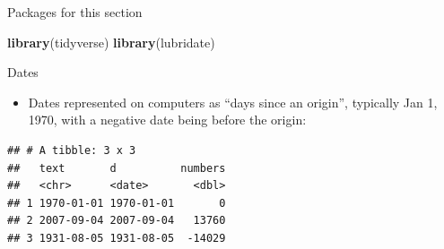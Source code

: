 \documentclass[ignorenonframetext,]{beamer}
\newenvironment{Shaded}{\begin{snugshade}}{\end{snugshade}}
\newcommand{\DataTypeTok}[1]{\textcolor[rgb]{0.13,0.29,0.53}{#1}}
\newcommand{\KeywordTok}[1]{\textcolor[rgb]{0.13,0.29,0.53}{\textbf{#1}}}
\newcommand{\NormalTok}[1]{#1}
\newcommand{\OperatorTok}[1]{\textcolor[rgb]{0.81,0.36,0.00}{\textbf{#1}}}
\newcommand{\StringTok}[1]{\textcolor[rgb]{0.31,0.60,0.02}{#1}}
\providecommand{\tightlist}{%
  \setlength{\itemsep}{0pt}\setlength{\parskip}{0pt}}
\begin{document}
\begin{frame}[fragile]{Packages for this section}
\protect\hypertarget{packages-for-this-section}{}

\begin{Shaded}
\begin{Highlighting}[]
\KeywordTok{library}\NormalTok{(tidyverse)}
\KeywordTok{library}\NormalTok{(lubridate)}
\end{Highlighting}
\end{Shaded}

\end{frame}

\begin{frame}[fragile]{Dates}
\protect\hypertarget{dates}{}

\begin{itemize}
\tightlist
\item
  Dates represented on computers as ``days since an origin'', typically
  Jan 1, 1970, with a negative date being before the origin:
\end{itemize}

\begin{Shaded}
\end{Shaded}

\begin{verbatim}
## # A tibble: 3 x 3
##   text       d          numbers
##   <chr>      <date>       <dbl>
## 1 1970-01-01 1970-01-01       0
## 2 2007-09-04 2007-09-04   13760
## 3 1931-08-05 1931-08-05  -14029
\end{verbatim}

\end{frame}
\end{document}
